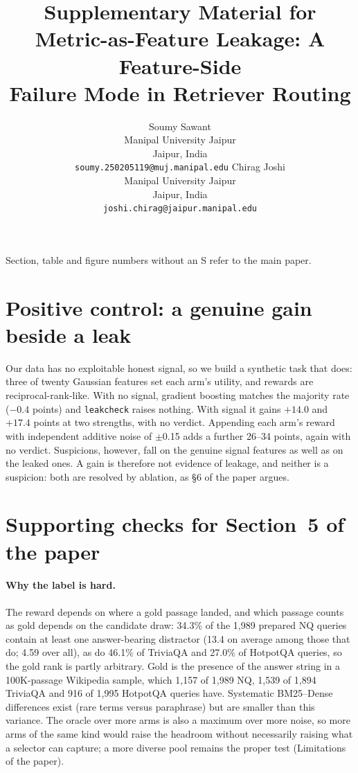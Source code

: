 \documentclass{article}
\title{Supplementary Material for\\ Metric-as-Feature Leakage: A Feature-Side\\
       Failure Mode in Retriever Routing}
\author{
  Soumy Sawant\\
  Manipal University Jaipur\\
  Jaipur, India\\
  \texttt{soumy.250205119@muj.manipal.edu}
  \And
  Chirag Joshi\\
  Manipal University Jaipur\\
  Jaipur, India\\
  \texttt{joshi.chirag@jaipur.manipal.edu}
}
\begin{document}
\maketitle
\renewcommand{\thesection}{S\arabic{section}}
Section, table and figure numbers without an S refer to the main paper.

\section{Positive control: a genuine gain beside a leak}
\label{sup:positive}
Our data has no exploitable honest signal, so we build a synthetic task that does: three of twenty Gaussian features set each arm's
utility, and rewards are reciprocal-rank-like. With no signal, gradient boosting matches the
majority rate ($-0.4$ points) and \texttt{leakcheck} raises nothing. With signal it gains $+14.0$
and $+17.4$ points at two strengths, with no verdict. Appending each arm's reward with independent
additive noise of $\pm$0.15 adds a further 26--34 points, again with no verdict. Suspicions, however, fall on
the genuine signal features as well as on the leaked ones. A gain is therefore not evidence of
leakage, and neither is a suspicion: both are resolved by ablation, as \S6 of the paper argues.


\section{Supporting checks for Section~5 of the paper}
\label{app:checks}

\paragraph{Why the label is hard.} The reward depends on where a gold passage landed, and which
passage counts as gold depends on the candidate draw: 34.3\% of the 1{,}989 prepared NQ queries
contain at least one answer-bearing distractor (13.4 on average among those that do; 4.59 over
all), as do 46.1\% of TriviaQA and 27.0\% of HotpotQA queries, so the gold rank is partly
arbitrary. Gold is the presence of the answer string in a 100K-passage Wikipedia sample, which
1{,}157 of 1{,}989 NQ, 1{,}539 of 1{,}894 TriviaQA and 916 of 1{,}995 HotpotQA queries have. Systematic BM25--Dense differences exist (rare terms
versus paraphrase) but are smaller than this variance. The oracle over more arms is also a maximum over more noise, so more arms of the same
kind would raise the headroom without necessarily raising what a selector can capture; a more
diverse pool remains the proper test (Limitations of the paper).
\end{document}
